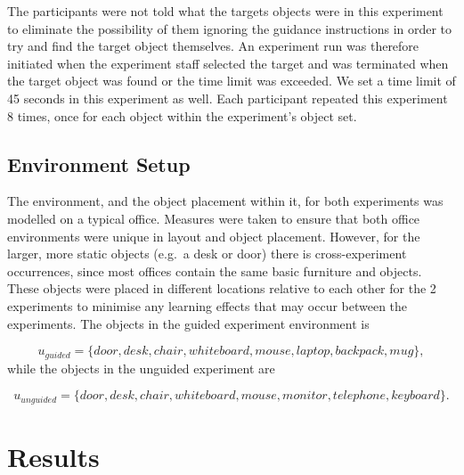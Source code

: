 \documentclass[runningheads]{llncs}
\begin{document}
The participants were not told what the targets objects were in this experiment to eliminate the possibility of them ignoring the guidance instructions in order to try and find the target object themselves.
An experiment run was therefore initiated when the experiment staff selected the target and was terminated when the target object was found or the time limit was exceeded.
We set a time limit of 45 seconds in this experiment as well.
Each participant repeated this experiment 8 times, once for each object within the experiment's object set. 

\subsection{Environment Setup}

The environment, and the object placement within it, for both experiments was modelled on a typical office.
Measures were taken to ensure that both office environments were unique in layout and object placement. 
However, for the larger, more static objects (e.g.\ a desk or door) there is cross-experiment occurrences, since most offices contain the same basic furniture and objects. 
These objects were placed in different locations relative to each other for the 2 experiments to minimise any learning effects that may occur between the experiments. 
The objects in the guided experiment environment is

\begin{equation}
  u_{guided} = \{ door, desk, chair, whiteboard, mouse, laptop, backpack, mug \},
\end{equation}
while the objects in the unguided experiment are

\begin{equation}
  u_{unguided} = \{ door, desk, chair, whiteboard, mouse, monitor, telephone, keyboard \}.
\end{equation}


\section{Results}\label{sec:results}
\end{document}
